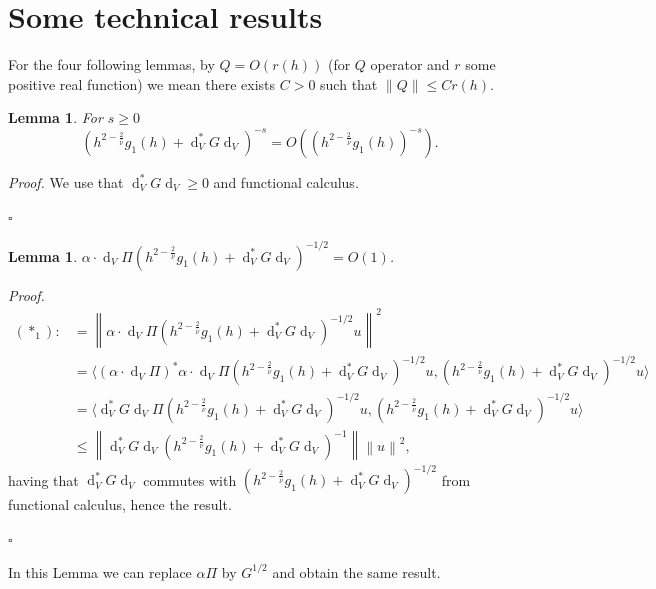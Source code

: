 \documentclass[12pt]{amsart}
\def\<{\langle}
\def\>{\rangle}
\newcommand{\bp}{{\it Proof. }}
\newcommand{\ep}{\hfill $\square$}
\renewcommand{\d}{\operatorname{d}}
\numberwithin{equation}{section}
\numberwithin{figure}{section}
\newcommand{\vvert}[1]{\left\lVert#1\right\rVert}
\newtheorem{lemma}[defin]{Lemma}
\begin{document}
\section{Some technical results}

For the four following lemmas, by $Q = O(r(h))$ (for $Q$ operator and $r$ some positive real function) we mean there exists $C>0$ such that $\vvert{Q} \leq Cr(h)$.

\begin{lemma}\label{lem:1}
For $s\geq0$
\begin{equation*}
(h^{2-\frac2{\overline{\nu}}}g_1(h) + \d_V^*G\d_V)^{-s} = O((h^{2-\frac2{\overline{\nu}}}g_1(h))^{-s}).
\end{equation*}
\end{lemma}
\bp We use that $\d_V^*G\d_V\geq0$ and functional calculus.

\ep

\begin{lemma}\label{lem:2}
    $\alpha\cdot \d_V\Pi(h^{2-\frac2{\overline{\nu}}}g_1(h) + \d_V^*G\d_V)^{-1/2} = O(1)$.
\end{lemma}
\bp
\begin{equation*}
\begin{split}
    (\ast_1) :&= \vvert{\alpha\cdot \d_V\Pi(h^{2-\frac2{\overline{\nu}}}g_1(h) + \d_V^*G\d_V)^{-1/2}u}^2\\
    &= \<(\alpha\cdot \d_V\Pi)^*\alpha\cdot \d_V\Pi(h^{2-\frac2{\overline{\nu}}}g_1(h) + \d_V^*G\d_V)^{-1/2}u,(h^{2-\frac2{\overline{\nu}}}g_1(h) + \d_V^*G\d_V)^{-1/2}u\>\\
    &= \<\d_V^*G\d_V\Pi(h^{2-\frac2{\overline{\nu}}}g_1(h) + \d_V^*G\d_V)^{-1/2}u,(h^{2-\frac2{\overline{\nu}}}g_1(h) + \d_V^*G\d_V)^{-1/2}u\>\\
    &\leq \vvert{\d_V^*G\d_V(h^{2-\frac2{\overline{\nu}}}g_1(h) + \d_V^*G\d_V)^{-1}}\vvert{u}^2,
\end{split}
\end{equation*}
having that $\d_V^*G\d_V$ commutes with $(h^{2-\frac2{\overline{\nu}}}g_1(h) + \d_V^*G\d_V)^{-1/2}$ from functional calculus, hence the result.

\ep

In this Lemma we can replace $\alpha\Pi$ by $G^{1/2}$ and obtain the same result.
\end{document}
